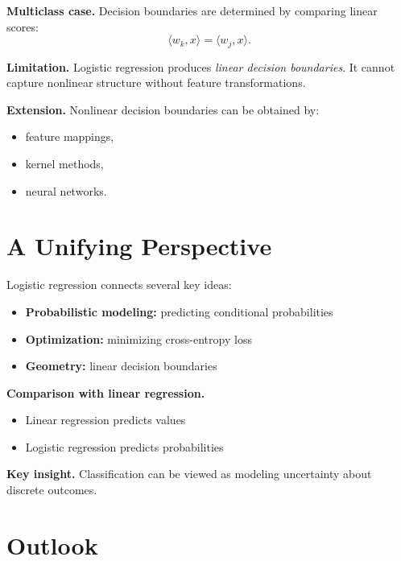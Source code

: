 \medskip

\noindent
\textbf{Multiclass case.}  
Decision boundaries are determined by comparing linear scores:
\[
\langle w_k, x \rangle = \langle w_j, x \rangle.
\]

\medskip

\noindent
\textbf{Limitation.}  
Logistic regression produces \emph{linear decision boundaries}. It cannot capture nonlinear structure without feature transformations.

\medskip

\noindent
\textbf{Extension.}  
Nonlinear decision boundaries can be obtained by:
\begin{itemize}
    \item feature mappings,
    \item kernel methods,
    \item neural networks.
\end{itemize}

\section{A Unifying Perspective}

Logistic regression connects several key ideas:

\begin{itemize}
    \item \textbf{Probabilistic modeling:} predicting conditional probabilities
    \item \textbf{Optimization:} minimizing cross-entropy loss
    \item \textbf{Geometry:} linear decision boundaries
\end{itemize}

\medskip

\noindent
\textbf{Comparison with linear regression.}
\begin{itemize}
    \item Linear regression predicts values
    \item Logistic regression predicts probabilities
\end{itemize}

\medskip

\noindent
\textbf{Key insight.}  
Classification can be viewed as modeling uncertainty about discrete outcomes.

\section{Outlook}

